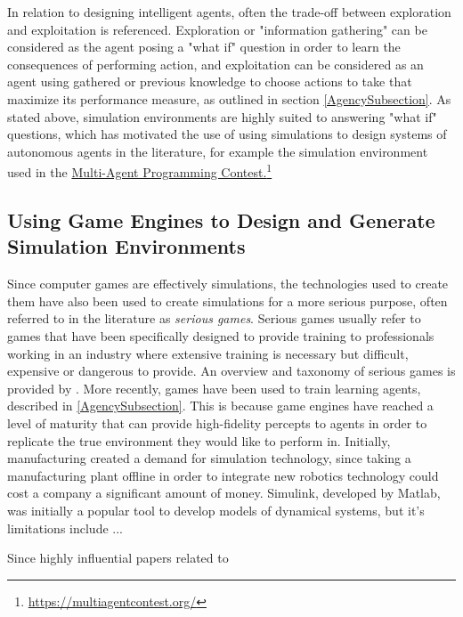 
 In relation to designing intelligent agents, often the trade-off between exploration and exploitation is referenced. Exploration or "information gathering" \cite{AIAMA} can be considered as the agent posing a "what if" question in order to learn the consequences of performing action, and exploitation can be considered as an agent using gathered or previous knowledge to choose actions to take that maximize its performance measure, as outlined in section \ref{AgencySubsection}. As stated above, simulation environments are highly suited to answering "what if" questions, which has motivated the use of using simulations to design systems of autonomous agents in the literature, for example the simulation environment used in the 
\href{https://multiagentcontest.org/}{Multi-Agent Programming Contest.}\footnote{\href {https://multiagentcontest.org/}{https://multiagentcontest.org/}}



\subsection{Using Game Engines to Design and Generate Simulation Environments}\label{GameEngineReview}
Since computer games are effectively simulations, the technologies used to create them have also been used to create simulations for a more serious purpose, often referred to in the literature as \textit{serious games}. Serious games usually refer to games that have been specifically designed to provide training to professionals working in an industry where extensive training is necessary but difficult, expensive or dangerous to provide. An overview and taxonomy of serious games is provided by \citeauthor{Laamarti2014AnGames} \cite{Laamarti2014AnGames}. More recently, games have been used to train learning agents, described in \ref{AgencySubsection}. This is because game engines have reached a level of maturity that can provide high-fidelity percepts to agents in order to replicate the true environment they would like to perform in. Initially, manufacturing created a demand for simulation technology, since taking a manufacturing plant offline in order to integrate new robotics technology could cost a company a significant amount of money. Simulink, developed by Matlab, was initially a popular tool to develop models of dynamical systems, but it's limitations include ...

Since highly influential papers related to 


